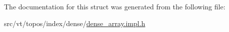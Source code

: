 The documentation for this struct was generated from the following file\+:\begin{DoxyCompactItemize}
\item 
src/vt/topos/index/dense/\hyperlink{dense__array_8impl_8h}{dense\+\_\+array.\+impl.\+h}\end{DoxyCompactItemize}
